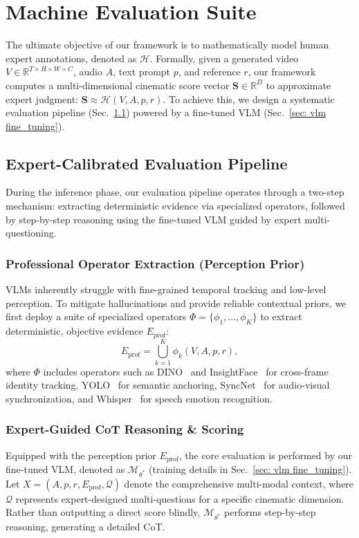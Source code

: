 \documentclass{article}
\begin{document}
\section{Machine Evaluation Suite}

The ultimate objective of our framework is to mathematically model human expert annotations, denoted as $\mathcal{H}$. Formally, given a generated video $V \in \mathbb{R}^{T \times H \times W \times C}$, audio $A$, text prompt $p$, and reference $r$, our framework computes a multi-dimensional cinematic score vector $\mathbf{S} \in \mathbb{R}^D$ to approximate expert judgment: $\mathbf{S} \approx \mathcal{H}(V, A, p, r)$. To achieve this, we design a systematic evaluation pipeline (Sec.~\ref{sec: machine pipeline}) powered by a fine-tuned VLM (Sec.~\ref{sec: vlm fine_tuning}).

\subsection{Expert-Calibrated Evaluation Pipeline}
\label{sec: machine pipeline}
During the inference phase, our evaluation pipeline operates through a two-step mechanism: extracting deterministic evidence via specialized operators, followed by step-by-step reasoning using the fine-tuned VLM guided by expert multi-questioning.

\subsubsection{Professional Operator Extraction (Perception Prior)} VLMs inherently struggle with fine-grained temporal tracking and low-level perception. To mitigate hallucinations and provide reliable contextual priors, we first deploy a suite of specialized operators $\Phi = \{\phi_1, \dots, \phi_K\}$ to extract deterministic, objective evidence $E_{\text{prof}}$:
\begin{equation}
    E_{\text{prof}} = \bigcup_{k=1}^{K} \phi_k(V, A, p, r),
\end{equation}
where $\Phi$ includes operators such as DINO~\cite{oquab2023dinov2} and InsightFace~\cite{arcface} for cross-frame identity tracking, YOLO~\cite{khanam2024yolov11} for semantic anchoring, SyncNet~\cite{syncnet} for audio-visual synchronization, and Whisper~\cite{whisper} for speech emotion recognition.

\subsubsection{Expert-Guided CoT Reasoning \& Scoring} Equipped with the perception prior $E_{\text{prof}}$, the core evaluation is performed by our fine-tuned VLM, denoted as $\mathcal{M}_{\theta^*}$ (training details in Sec.~\ref{sec: vlm fine_tuning}). Let $X = (A, p, r, E_{\text{prof}}, \mathcal{Q})$ denote the comprehensive multi-modal context, where $\mathcal{Q}$ represents expert-designed multi-questions for a specific cinematic dimension. Rather than outputting a direct score blindly, $\mathcal{M}_{\theta^*}$ performs step-by-step reasoning, generating a detailed CoT. 
\end{document}
